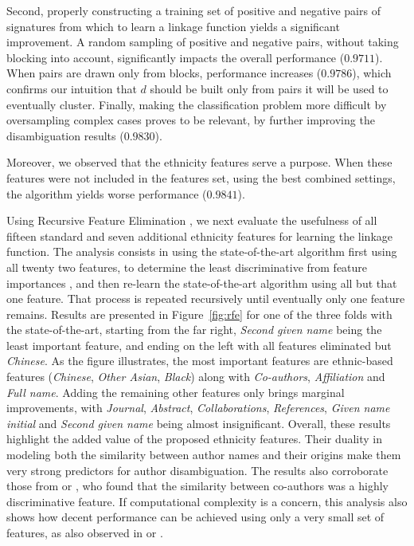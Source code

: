 \documentclass[runningheads,a4paper]{llncs}
\begin{document}
Second, properly constructing a training set of positive and negative pairs of
signatures from which to learn a linkage function yields a significant
improvement.
A random sampling of positive and negative pairs, without taking
blocking into account, significantly impacts the overall performance
($0.9711$). When pairs are drawn only from blocks, performance increases
($0.9786$), which confirms our intuition that $d$ should be built only from
pairs it will be used to eventually cluster. Finally, making the classification
problem more difficult by oversampling complex cases proves to be relevant,
by further improving the disambiguation results ($0.9830$).

Moreover, we observed that the ethnicity features serve a purpose. When these features were not
included in the features set, using the best combined settings, the algorithm yields worse performance
($0.9841$).

Using Recursive Feature Elimination \cite{guyon2002gene}, we next evaluate the
usefulness of all fifteen standard and seven additional ethnicity features for learning
the linkage function. The analysis consists in using the state-of-the-art algorithm
first using all twenty two features, to determine the least discriminative from feature
importances \cite{louppe2013understanding}, and then re-learn the state-of-the-art algorithm
using all but that one feature. That process is repeated recursively until
eventually only one feature remains. Results are presented in
Figure~\ref{fig:rfe} for one of the three folds with
the state-of-the-art, starting from the far right, \textit{Second given name} being the least important feature,
and ending on the left with all features eliminated but \textit{Chinese}. As
the figure illustrates, the most important features are ethnic-based features
(\textit{Chinese}, \textit{Other Asian}, \textit{Black}) along with
\textit{Co-authors}, \textit{Affiliation} and \textit{Full name}. Adding the remaining
other features only brings marginal improvements, with \textit{Journal},
\textit{Abstract}, \textit{Collaborations}, \textit{References}, \textit{Given
name initial} and \textit{Second given name} being almost insignificant.
Overall, these results highlight the added value of the proposed ethnicity
features.
Their duality in modeling both the similarity between author names
and their origins make them very strong predictors for author disambiguation.
The results also corroborate those from \cite{kang2009co} or \cite{ferreira2010effective}, who
found that the similarity between co-authors was a highly discriminative
feature.
If computational complexity is a concern, this analysis also
shows how decent performance can be achieved using only a very
small set of features, as also observed in
\cite{treeratpituk2009disambiguating} or \cite{levin2012citation}.
\end{document}

